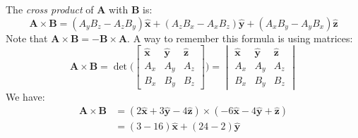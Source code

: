 \documentclass[crop=false,class=book,oneside]{standalone}
\begin{document}
            \begin{solution}
                The \textit{cross product} of $\mathbf{A}$
                with $\mathbf{B}$ is:
                \begin{equation}
                    \mathbf{A}\times\mathbf{B}
                    =(A_{y}B_{z}-A_{z}B_{y})\hat{\mathbf{x}}
                    +(A_{z}B_{x}-A_{x}B_{z})\hat{\mathbf{y}}
                    +(A_{x}B_{y}-A_{y}B_{x})\hat{\mathbf{z}}
                \end{equation}
                Note that
                $\mathbf{A}\times\mathbf{B}%
                 =-\mathbf{B}\times\mathbf{A}$.
                A way to remember this formula is using matrices:
                \begin{equation}
                    \mathbf{A}\times\mathbf{B}
                    =\det\Bigg(
                        \begin{bmatrix}
                            \hat{\mathbf{x}}
                            &\hat{\mathbf{y}}
                            &\hat{\mathbf{z}}\\
                            A_{x}&A_{y}&A_{z}\\
                            B_{x}&B_{y}&B_{z}
                        \end{bmatrix}
                    \Bigg)
                    =
                    \begin{vmatrix}
                        \hat{\mathbf{x}}
                        &\hat{\mathbf{y}}
                        &\hat{\mathbf{z}}\\
                        A_{x}&A_{y}&A_{z}\\
                        B_{x}&B_{y}&B_{z}
                    \end{vmatrix}
                \end{equation}
                We have:
                \begin{subequations}
                    \begin{align}
                        \mathbf{A}\times\mathbf{B}
                        &=
                        (2\hat{\mathbf{x}}
                        +3\hat{\mathbf{y}}
                        -4\hat{\mathbf{z}})
                        \times
                        (-6\hat{\mathbf{x}}
                        -4\hat{\mathbf{y}}
                        +\hat{\mathbf{z}})\\
                        &=
                        (3-16)\hat{\mathbf{x}}
                        +(24-2)\hat{\mathbf{y}}

\end{align}
\end{subequations}
\end{solution}
\end{document}
